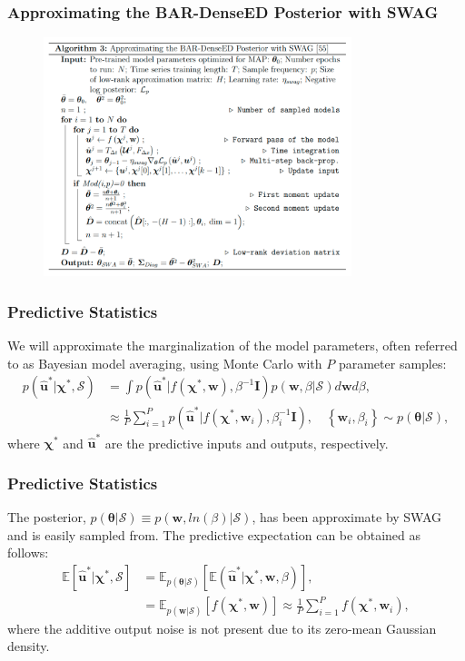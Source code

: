 \documentclass{beamer}
\theoremstyle{remark}
\begin{document}
\begin{frame}
\frametitle{Approximating the BAR-DenseED Posterior with SWAG}
\begin{figure}
\includegraphics[width=0.8\textwidth]{./figures/alg3.png}
\end{figure}
\end{frame}

\begin{frame}
\frametitle{Predictive Statistics}
We will approximate the marginalization of the model parameters, often referred to as Bayesian model averaging, using Monte Carlo with $P$ parameter samples:
\begin{align}
   p\left(\hat{\bm{u}}^{*}|\bm{\chi}^{*},\mathcal{S}\right)&=\int p\left(\hat{\bm{u}}^{*}|f\left(\bm{\chi}^{*},\textbf{w}\right) ,\beta^{-1}\bm{I}\right)p\left(\textbf{w},\beta|\mathcal{S}\right)d\textbf{w}d\beta,  \nonumber \\
    &\approx \frac{1}{P}\sum_{i=1}^{P}p\left(\hat{\bm{u}}^{*}|f\left(\bm{\chi}^{*},\textbf{w}_{i}\right) ,\beta_{i}^{-1}\bm{I}\right), \quad \left\{\textbf{w}_{i},\beta_{i}\right\} \sim p\left(\bm{\theta}|\mathcal{S}\right),
\end{align}
where $\bm{\chi}^{*}$ and $\hat{\bm{u}}^{*}$ are the predictive inputs and outputs, respectively.
\end{frame}

\begin{frame}
\frametitle{Predictive Statistics}
The posterior, $p(\bm{\theta}|\mathcal{S}) \equiv p(\textbf{w}, ln(\beta)|\mathcal{S})$, has been approximate by SWAG and is easily sampled from.
The predictive expectation can be obtained as follows:
\begin{align}
    \mathbb{E}\left[\hat{\bm{u}}^{*}|\bm{\chi}^{*},\mathcal{S}\right]&=\mathbb{E}_{p\left(\bm{\theta}|\mathcal{S}\right)}\left[\mathbb{E}\left(\hat{\bm{u}}^{*}|\bm{\chi}^{*},\textbf{w},\beta\right)\right],  \nonumber  \\
    &=\mathbb{E}_{p\left(\textbf{w}|\mathcal{S}\right)}\left[f\left(\bm{\chi}^{*},\textbf{w}\right)\right] \approx \frac{1}{P}\sum_{i=1}^{P}f\left(\bm{\chi}^{*},\textbf{w}_{i}\right),
    \label{eq:predictive-mean}
\end{align}
where the additive output noise is not present due to its zero-mean Gaussian density.
\end{frame}
\end{document}
